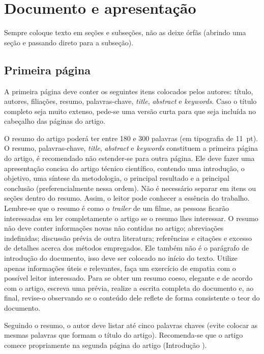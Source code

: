 \documentclass[12pt, a4paper, twoside, onecolumn]{article}
\begin{document}
\section{Documento e apresentação}

Sempre coloque texto em seções e subseções, não as deixe órfãs (abrindo uma seção e passando direto para a subseção).

\subsection{Primeira página}

A primeira página deve conter os seguintes itens colocados pelos autores: título, autores, filiações, resumo, palavras-chave, \textit{title}, \textit{abstract} e \textit{keywords}. 
%
Caso o título completo seja muito extenso, pede-se uma versão curta para que seja incluída no cabeçalho das páginas do artigo.


O resumo do artigo poderá ter entre 180 e 300 palavras (em tipografia de 11~pt). O resumo, palavras-chave, \textit{title}, \textit{abstract} e \textit{keywords} constituem a primeira página do artigo, é recomendado não estender-se para outra página. 
Ele deve fazer uma apresentação concisa do artigo técnico científico, contendo uma introdução, o objetivo, uma síntese da metodologia, o principal resultado e a principal conclusão (preferencialmente nessa ordem). Não é necessário separar em itens ou seções dentro do resumo. Assim, o leitor pode conhecer a essência do trabalho. Lembre-se que o resumo é como o \textit{trailer} de um filme, as pessoas ficarão interessadas em ler completamente o artigo se o resumo lhes interessar. O resumo não deve conter informações novas não contidas no artigo; abreviações indefinidas; discussão prévia de outra literatura; referências e citações e excesso de detalhes acerca dos métodos empregados. Ele também não é o parágrafo de introdução do documento, isso deve ser colocado no início do texto. Utilize apenas informações úteis e relevantes, faça um exercício de empatia com o possível leitor interessado. Para se obter um resumo coeso, elegante e de acordo com o artigo, escreva uma prévia, realize a escrita completa do documento e, ao final, revise-o observando se o conteúdo dele reflete de forma consistente o teor do documento. 

Seguindo o resumo, o autor deve listar até cinco palavras chaves (evite colocar as mesmas palavras que formam o título do artigo).
Recomenda-se que o artigo comece propriamente na segunda página do artigo (Introdução \etc).
\end{document}
